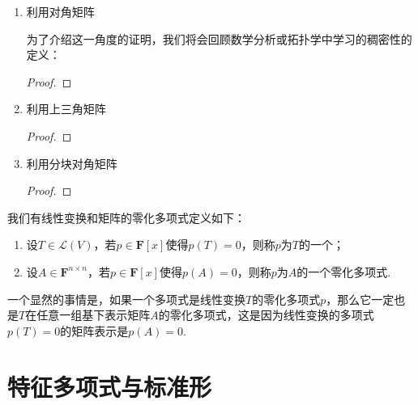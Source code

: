 \begin{enumerate}
    \item 利用对角矩阵

          为了介绍这一角度的证明，我们将会回顾数学分析或拓扑学中学习的稠密性的定义：
          \begin{definition}

          \end{definition}

          \begin{lemma}

          \end{lemma}

          \begin{proof}

          \end{proof}

    \item 利用上三角矩阵

          \begin{proof}

          \end{proof}

    \item 利用分块对角矩阵

          \begin{proof}

          \end{proof}
\end{enumerate}

\begin{definition}[零化多项式] 
    我们有线性变换和矩阵的零化多项式定义如下：
    \begin{enumerate}
        \item 设$T\in \mathcal{L}(V)$，若$p\in\mathbf{F}[x]$使得$p(T)=0$，则称$p$为$T$的一个；

        \item 设$A\in\mathbf{F}^{n\times n}$，若$p\in\mathbf{F}[x]$使得$p(A)=0$，则称$p$为$A$的一个零化多项式.
    \end{enumerate}
\end{definition}

一个显然的事情是，如果一个多项式是线性变换$T$的零化多项式$p$，那么它一定也是$T$在任意一组基下表示矩阵$A$的零化多项式，这是因为线性变换的多项式$p(T)=0$的矩阵表示是$p(A)=0$.

\section{特征多项式与标准形}

